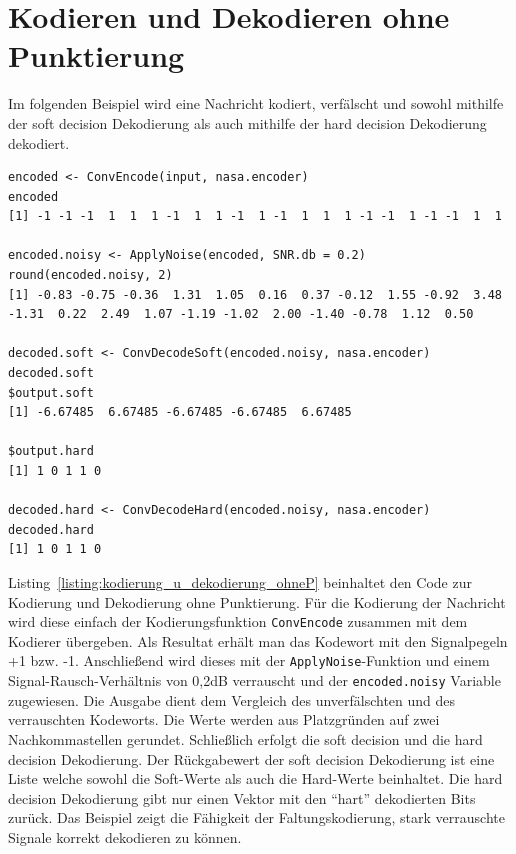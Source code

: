 \section{Kodieren und Dekodieren ohne Punktierung}
\label{kapitel:beispiele_kodieren_ohneP}
Im folgenden Beispiel wird eine Nachricht kodiert, verfälscht und sowohl mithilfe der soft decision Dekodierung als auch mithilfe der hard decision Dekodierung dekodiert.
\begin{lstlisting}[caption=Kodierung und Dekodierung ohne Punktierung, label={listing:kodierung_u_dekodierung_ohneP}, float=!tbh]
encoded <- ConvEncode(input, nasa.encoder)
encoded
[1] -1 -1 -1  1  1  1 -1  1  1 -1  1 -1  1  1  1 -1 -1  1 -1 -1  1  1
 
encoded.noisy <- ApplyNoise(encoded, SNR.db = 0.2)
round(encoded.noisy, 2)
[1] -0.83 -0.75 -0.36  1.31  1.05  0.16  0.37 -0.12  1.55 -0.92  3.48 -1.31  0.22  2.49  1.07 -1.19 -1.02  2.00 -1.40 -0.78  1.12  0.50

decoded.soft <- ConvDecodeSoft(encoded.noisy, nasa.encoder)
decoded.soft
$output.soft
[1] -6.67485  6.67485 -6.67485 -6.67485  6.67485

$output.hard
[1] 1 0 1 1 0

decoded.hard <- ConvDecodeHard(encoded.noisy, nasa.encoder)
decoded.hard
[1] 1 0 1 1 0
\end{lstlisting}
Listing~\ref{listing:kodierung_u_dekodierung_ohneP} beinhaltet den Code zur Kodierung und Dekodierung ohne Punktierung. Für die Kodierung der Nachricht wird diese einfach der Kodierungsfunktion \texttt{ConvEncode} zusammen mit dem Kodierer übergeben. Als Resultat erhält man das Kodewort mit den Signalpegeln +1 bzw. -1. Anschließend wird dieses mit der \texttt{ApplyNoise}-Funktion und einem Signal-Rausch-Verhältnis von 0,2dB verrauscht und der \texttt{encoded.noisy} Variable zugewiesen. Die Ausgabe dient dem Vergleich des unverfälschten und des verrauschten Kodeworts. Die Werte werden aus Platzgründen auf zwei Nachkommastellen gerundet. Schließlich erfolgt die soft decision und die hard decision Dekodierung. Der Rückgabewert der soft decision Dekodierung ist eine Liste welche sowohl die Soft-Werte als auch die Hard-Werte beinhaltet. Die hard decision Dekodierung gibt nur einen Vektor mit den \enquote{hart} dekodierten Bits zurück. Das Beispiel zeigt die Fähigkeit der Faltungskodierung, stark verrauschte Signale korrekt dekodieren zu können.

